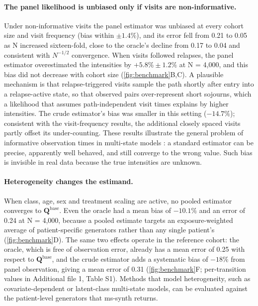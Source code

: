 \documentclass[11pt,a4paper]{article}
\newcommand{\Q}{\mathbf{Q}}
\begin{document}
\paragraph{The panel likelihood is unbiased only if visits are non-informative.}
Under non-informative visits the panel estimator was unbiased at every cohort size and visit frequency (bias within $\pm1.4\%$), and its error fell from 0.21 to 0.05 as N increased sixteen-fold, close to the oracle's decline from 0.17 to 0.04 and consistent with $N^{-1/2}$ convergence. When visits followed relapses, the panel estimator overestimated the intensities by $+5.8\% \pm 1.2\%$ at N = 4,000, and this bias did not decrease with cohort size (\cref{fig:benchmark}B,C). A plausible mechanism is that relapse-triggered visits sample the path shortly after entry into a relapse-active state, so that observed pairs over-represent short sojourns, which a likelihood that assumes path-independent visit times explains by higher intensities. The crude estimator's bias was smaller in this setting ($-14.7\%$); consistent with the visit-frequency results, the additional closely spaced visits partly offset its under-counting. These results illustrate the general problem of informative observation times in multi-state models \cite{lange2015}: a standard estimator can be precise, apparently well behaved, and still converge to the wrong value. Such bias is invisible in real data because the true intensities are unknown.

\paragraph{Heterogeneity changes the estimand.}
When class, age, sex and treatment scaling are active, no pooled estimator converges to $\Q^{\mathrm{base}}$. Even the oracle had a mean bias of $-10.1\%$ and an error of 0.24 at N = 4,000, because a pooled estimate targets an exposure-weighted average of patient-specific generators rather than any single patient's (\cref{fig:benchmark}D). The same two effects operate in the reference cohort: the oracle, which is free of observation error, already has a mean error of 0.25 with respect to $\Q^{\mathrm{base}}$, and the crude estimator adds a systematic bias of $-18\%$ from panel observation, giving a mean error of 0.31 (\cref{fig:benchmark}F; per-transition values in Additional file 1, Table S1). Methods that model heterogeneity, such as covariate-dependent or latent-class multi-state models, can be evaluated against the patient-level generators that ms-synth returns.
\end{document}
